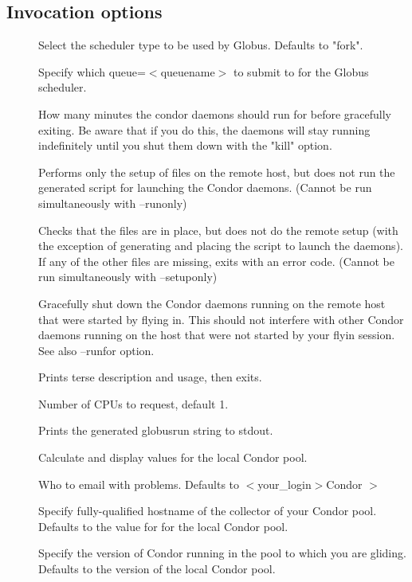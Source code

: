 \subsection{Invocation options}
\begin{description}
\item[]
	Select the scheduler type to be used by Globus. Defaults to "fork".

\item[]
	Specify which queue=$<$queuename$>$ to submit to for the Globus scheduler.

\item[]
   How many minutes the condor daemons should run for before gracefully
   exiting.  
   Be aware that if you do this, the daemons will stay running indefinitely
   until you shut them down with the "kill" option.

\item[]
   Performs only the setup of files on the remote host, but does not
   run the generated script for launching the Condor daemons.
   (Cannot be run simultaneously with --runonly)

\item[]
   Checks that the files are in place, but does not do the remote setup
   (with the exception of generating and placing the script to launch
   the daemons). If any of the other files are missing, exits with
   an error code.
   (Cannot be run simultaneously with --setuponly)

\item[]
   Gracefully shut down the Condor daemons running on the remote host
   that were started by flying in. This should not interfere with other
   Condor daemons running on the host that were not started by your
   flyin session.
   See also --runfor option.

\item[]
   Prints terse description and usage, then exits.

\item[]
	Number of CPUs to request, default 1.

\item[]
	Prints the generated globusrun string to stdout.

\item[]
	Calculate and display values for the local Condor pool.

\item[]
	Who to email with problems. Defaults to $<$your\_login$>$Condor $>$

\item[]
	Specify fully-qualified hostname of the collector of your Condor pool.
	Defaults to the value for  for the local Condor pool.

\item[]
	Specify the version of Condor running in the pool to which you are gliding.
	Defaults to the version of the local Condor pool.
\end{description}
